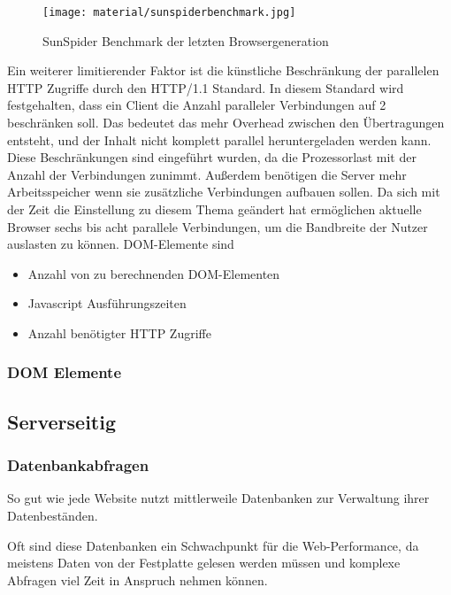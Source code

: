\begin{figure}[htbp]
  \centering
  \texttt{[image: material/sunspiderbenchmark.jpg]}
  \caption{SunSpider Benchmark der letzten Browsergeneration}
  \label{fig:sunspider}
\end{figure}
Ein weiterer limitierender Faktor ist die künstliche Beschränkung der parallelen HTTP Zugriffe durch den HTTP/1.1 Standard. In diesem Standard wird festgehalten, dass ein Client die Anzahl paralleler Verbindungen auf 2 beschränken soll. %
Das bedeutet das mehr Overhead zwischen den Übertragungen entsteht, und der Inhalt nicht komplett parallel heruntergeladen werden kann. Diese Beschränkungen sind eingeführt wurden, da die Prozessorlast mit der Anzahl der Verbindungen zunimmt. Außerdem benötigen die Server mehr Arbeitsspeicher wenn sie zusätzliche Verbindungen aufbauen sollen. Da sich mit der Zeit die Einstellung zu diesem Thema geändert hat ermöglichen aktuelle Browser sechs bis acht parallele Verbindungen, um die Bandbreite der Nutzer auslasten zu können. DOM-Elemente sind 
\begin{itemize}
  \item Anzahl von zu berechnenden DOM-Elementen %
  \item Javascript Ausführungszeiten
  \item Anzahl benötigter HTTP Zugriffe %
\end{itemize}

\subsubsection{DOM Elemente}
\subsection{Serverseitig}


\subsubsection{Datenbankabfragen}
So gut wie jede Website nutzt mittlerweile Datenbanken zur Verwaltung ihrer Datenbeständen.

Oft sind diese Datenbanken ein Schwachpunkt für die Web-Performance, da meistens Daten von der Festplatte gelesen werden müssen und komplexe Abfragen viel Zeit in Anspruch nehmen können.

